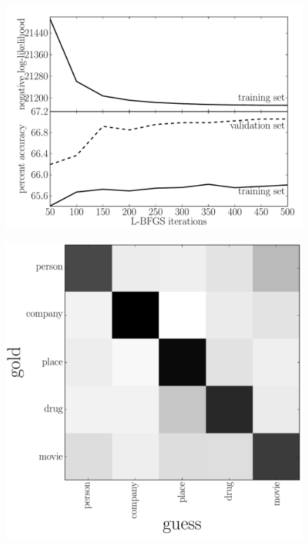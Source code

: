 \documentclass[11pt]{article}
\newcommand{\figlabel}[1]{\label{fig:#1}}
\begin{document}
\begin{figure}[htbp]
\begin{center}
    \includegraphics[width=\textwidth]{unigram_convergence.pdf}
\end{center}
\caption{%
\figlabel{unigram-convergence}}
\end{figure}

\begin{figure}[htbp]
\begin{center}
    \includegraphics[width=\textwidth]{unigram_confusion.pdf}
\end{center}
\caption{%
\figlabel{unigram-confusion}}
\end{figure}
\end{document}
